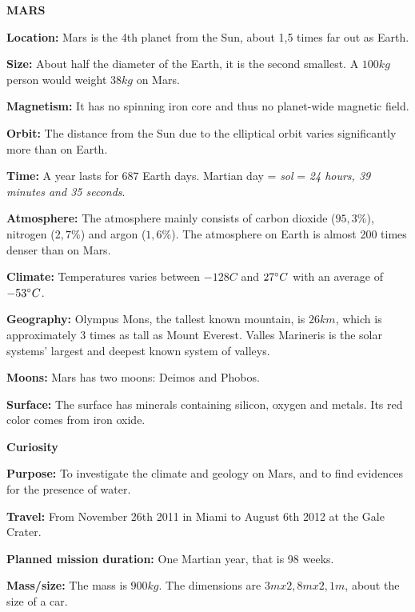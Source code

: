 \begin{tcolorbox}[colback=red!5,colframe=DarkRed!40!black,title=Mars \& Curiosity: The Red Planet and the rover]
\textbf{\large{MARS}}

\textbf{Location:} Mars is the 4th planet from the Sun, about 1,5 times far out as Earth.

\textbf{Size:} About half the diameter of the Earth, it is the second smallest.
A $100 kg$ person would weight $38 kg$ on Mars.

\textbf{Magnetism:} It has no spinning iron core and thus no planet-wide magnetic field.

\textbf{Orbit:} The distance from the Sun due to the elliptical orbit varies significantly more than on Earth.

\textbf{Time:} A year lasts for $687$ Earth days.
Martian day = \textit{sol} = \textit{24 hours, 39 minutes and 35 seconds}.

\textbf{Atmosphere:} The atmosphere mainly consists of carbon dioxide ($95,3 \%$), nitrogen ($2,7 \%$) and argon ($1,6\%$).
The atmosphere on Earth is almost 200 times denser than on Mars.

\textbf{Climate:} Temperatures varies between $-128C$ and $27 \degree C$ with an average of $-53 \degree C$.

\textbf{Geography:} Olympus Mons, the tallest known mountain, is $26 km$, which is approximately 3 times as tall as Mount Everest.
Valles Marineris is the solar systems' largest and deepest known system of valleys.

\textbf{Moons:} Mars has two moons: Deimos and Phobos.

\textbf{Surface:} The surface has minerals containing silicon, oxygen and metals.
Its red color comes from iron oxide.

\noindent\makebox[\linewidth]{\rule{\textwidth}{0.4pt}}
\vspace{0mm}

\textbf{\large{Curiosity}}

\textbf{Purpose:} To investigate the climate and geology on Mars, and to find evidences for the presence of water.

\textbf{Travel:} From November 26th 2011 in Miami to August 6th 2012 at the Gale Crater.

\textbf{Planned mission duration:} One Martian year, that is 98 weeks.

\textbf{Mass/size:} The mass is $900 kg$.
The dimensions are $3 m x 2,8 m x 2,1 m$, about the size of a car.


\end{tcolorbox}
